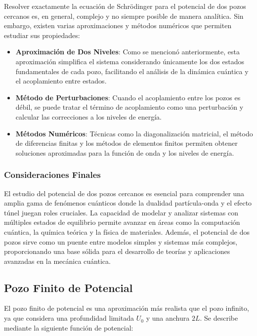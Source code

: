 \documentclass[a4paper,12pt]{article}
\begin{document}
Resolver exactamente la ecuación de Schrödinger para el potencial de dos pozos cercanos es, en general, complejo y no siempre posible de manera analítica. Sin embargo, existen varias aproximaciones y métodos numéricos que permiten estudiar sus propiedades:

\begin{itemize}
    \item \textbf{Aproximación de Dos Niveles}: Como se mencionó anteriormente, esta aproximación simplifica el sistema considerando únicamente los dos estados fundamentales de cada pozo, facilitando el análisis de la dinámica cuántica y el acoplamiento entre estados.
    
    \item \textbf{Método de Perturbaciones}: Cuando el acoplamiento entre los pozos es débil, se puede tratar el término de acoplamiento como una perturbación y calcular las correcciones a los niveles de energía.
    
    \item \textbf{Métodos Numéricos}: Técnicas como la diagonalización matricial, el método de diferencias finitas y los métodos de elementos finitos permiten obtener soluciones aproximadas para la función de onda y los niveles de energía.
\end{itemize}

\subsubsection{Consideraciones Finales}

El estudio del potencial de dos pozos cercanos es esencial para comprender una amplia gama de fenómenos cuánticos donde la dualidad partícula-onda y el efecto túnel juegan roles cruciales. La capacidad de modelar y analizar sistemas con múltiples estados de equilibrio permite avanzar en áreas como la computación cuántica, la química teórica y la física de materiales. Además, el potencial de dos pozos sirve como un puente entre modelos simples y sistemas más complejos, proporcionando una base sólida para el desarrollo de teorías y aplicaciones avanzadas en la mecánica cuántica.

\subsection{Pozo Finito de Potencial}

El pozo finito de potencial es una aproximación más realista que el pozo infinito, ya que considera una profundidad limitada \( U_0 \) y una anchura \( 2L \). Se describe mediante la siguiente función de potencial:
\end{document}
